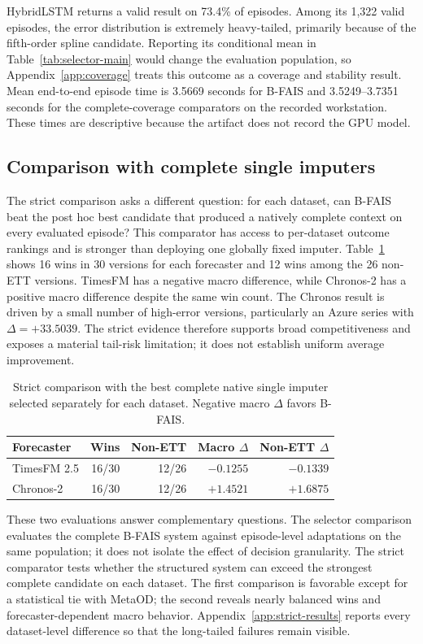 \documentclass{article}
\newcommand{\bfais}{\textsc{B-FAIS}\xspace}
\begin{document}
HybridLSTM returns a valid result on 73.4\% of episodes. Among its 1,322 valid episodes, the error distribution is extremely heavy-tailed, primarily because of the fifth-order spline candidate. Reporting its conditional mean in Table~\ref{tab:selector-main} would change the evaluation population, so Appendix~\ref{app:coverage} treats this outcome as a coverage and stability result. Mean end-to-end episode time is 3.5669 seconds for \bfais and 3.5249--3.7351 seconds for the complete-coverage comparators on the recorded workstation. These times are descriptive because the artifact does not record the GPU model.

\subsection{Comparison with complete single imputers}

The strict comparison asks a different question: for each dataset, can \bfais beat the post hoc best candidate that produced a natively complete context on every evaluated episode? This comparator has access to per-dataset outcome rankings and is stronger than deploying one globally fixed imputer. Table~\ref{tab:strict-main} shows 16 wins in 30 versions for each forecaster and 12 wins among the 26 non-ETT versions. TimesFM has a negative macro difference, while Chronos-2 has a positive macro difference despite the same win count. The Chronos result is driven by a small number of high-error versions, particularly an Azure series with $\Delta=+33.5039$. The strict evidence therefore supports broad competitiveness and exposes a material tail-risk limitation; it does not establish uniform average improvement.

\begin{table}[t]
\centering
\small
\setlength{\tabcolsep}{5pt}
\caption{Strict comparison with the best complete native single imputer selected separately for each dataset. Negative macro $\Delta$ favors \bfais.}
\label{tab:strict-main}
\begin{tabular}{lrrrr}
\toprule
Forecaster & Wins & Non-ETT & Macro $\Delta$ & Non-ETT $\Delta$ \\
\midrule
TimesFM 2.5 & 16/30 & 12/26 & $-0.1255$ & $-0.1339$ \\
Chronos-2 & 16/30 & 12/26 & $+1.4521$ & $+1.6875$ \\
\bottomrule
\end{tabular}
\end{table}

These two evaluations answer complementary questions. The selector comparison evaluates the complete \bfais system against episode-level adaptations on the same population; it does not isolate the effect of decision granularity. The strict comparator tests whether the structured system can exceed the strongest complete candidate on each dataset. The first comparison is favorable except for a statistical tie with MetaOD; the second reveals nearly balanced wins and forecaster-dependent macro behavior. Appendix~\ref{app:strict-results} reports every dataset-level difference so that the long-tailed failures remain visible.
\end{document}
